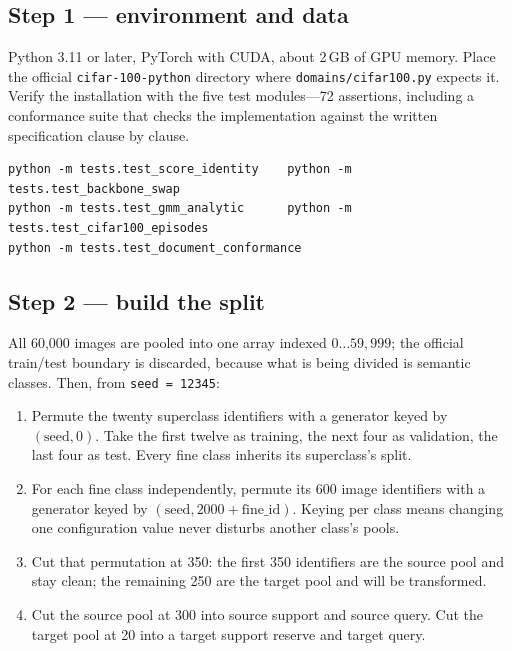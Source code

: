 \documentclass[11pt]{article}
\begin{document}
\subsection*{Step 1 --- environment and data}

Python 3.11 or later, PyTorch with CUDA, about 2\,GB of GPU memory. Place the official
\texttt{cifar-100-python} directory where \texttt{domains/cifar100.py} expects it. Verify the
installation with the five test modules---72 assertions, including a conformance suite that checks
the implementation against the written specification clause by clause.

\begin{verbatim}
python -m tests.test_score_identity    python -m tests.test_backbone_swap
python -m tests.test_gmm_analytic      python -m tests.test_cifar100_episodes
python -m tests.test_document_conformance
\end{verbatim}

\subsection*{Step 2 --- build the split}

All 60{,}000 images are pooled into one array indexed $0\ldots59{,}999$; the official train/test
boundary is discarded, because what is being divided is semantic classes. Then, from
\texttt{seed = 12345}:

\begin{enumerate}[leftmargin=*, itemsep=3pt]
\item Permute the twenty superclass identifiers with a generator keyed by $(\text{seed}, 0)$. Take
      the first twelve as training, the next four as validation, the last four as test. Every fine
      class inherits its superclass's split.
\item For each fine class independently, permute its 600 image identifiers with a generator keyed
      by $(\text{seed}, 2000+\text{fine\_id})$. Keying per class means changing one configuration
      value never disturbs another class's pools.
\item Cut that permutation at 350: the first 350 identifiers are the source pool and stay clean;
      the remaining 250 are the target pool and will be transformed.
\item Cut the source pool at 300 into source support and source query. Cut the target pool at 20
      into a target support reserve and target query.
\end{enumerate}
\end{document}
